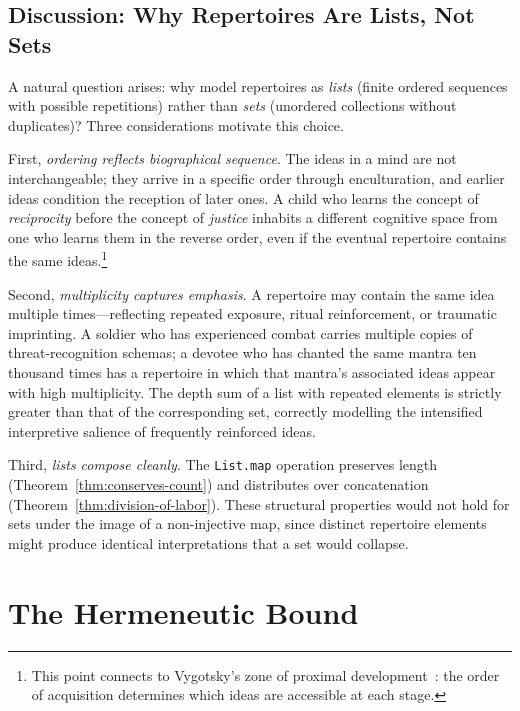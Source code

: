 \subsection*{Discussion: Why Repertoires Are Lists, Not Sets}

A natural question arises: why model repertoires as \emph{lists} (finite
ordered sequences with possible repetitions) rather than \emph{sets}
(unordered collections without duplicates)?  Three considerations
motivate this choice.

First, \emph{ordering reflects biographical sequence}.  The ideas in a
mind are not interchangeable; they arrive in a specific order through
enculturation, and earlier ideas condition the reception of later ones.
A child who learns the concept of \emph{reciprocity} before the concept
of \emph{justice} inhabits a different cognitive space from one who
learns them in the reverse order, even if the eventual repertoire
contains the same ideas.\footnote{This point connects to Vygotsky's
zone of proximal development~\cite{vygotsky1978}: the order of
acquisition determines which ideas are accessible at each stage.}

Second, \emph{multiplicity captures emphasis}.  A repertoire may contain
the same idea multiple times---reflecting repeated exposure, ritual
reinforcement, or traumatic imprinting.  A soldier who has experienced
combat carries multiple copies of threat-recognition schemas; a devotee
who has chanted the same mantra ten thousand times has a repertoire in
which that mantra's associated ideas appear with high multiplicity.  The
depth sum of a list with repeated elements is strictly greater than that
of the corresponding set, correctly modelling the intensified
interpretive salience of frequently reinforced ideas.

Third, \emph{lists compose cleanly}.  The \texttt{List.map} operation
preserves length (Theorem~\ref{thm:conserves-count}) and distributes
over concatenation (Theorem~\ref{thm:division-of-labor}).  These
structural properties would not hold for sets under the image of a
non-injective map, since distinct repertoire elements might produce
identical interpretations that a set would collapse.

\section{The Hermeneutic Bound}
\label{sec:ch1:hermeneutic-bound}

